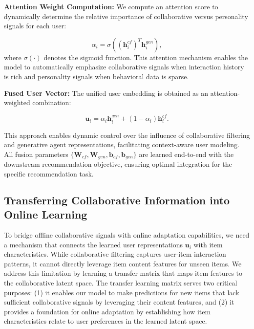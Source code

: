 \documentclass[acmsmall]{acmart}
\begin{document}
\textbf{Attention Weight Computation:} We compute an attention score to dynamically determine the relative importance of collaborative versus personality signals for each user:

\begin{equation}
\alpha_i = \sigma\left((\mathbf{h}^{cf}_i)^T \mathbf{h}^{gen}_i\right),
\label{eq:attention_weight}
\end{equation}
where $\sigma(\cdot)$ denotes the sigmoid function. This attention mechanism enables the model to automatically emphasize collaborative signals when interaction history is rich and personality signals when behavioral data is sparse.

\textbf{Fused User Vector:} The unified user embedding is obtained as an attention-weighted combination:

\begin{equation}
\mathbf{u}_i = \alpha_i \mathbf{h}^{gen}_i + (1 - \alpha_i) \mathbf{h}^{cf}_i.
\label{eq:final_fusion}
\end{equation}

This approach enables dynamic control over the influence of collaborative filtering and generative agent representations, facilitating context-aware user modeling. All fusion parameters $\{\mathbf{W}_{cf}, \mathbf{W}_{gen}, \mathbf{b}_{cf}, \mathbf{b}_{gen}\}$ are learned end-to-end with the downstream recommendation objective, ensuring optimal integration for the specific recommendation task.

\subsection{Transferring Collaborative Information into Online Learning}
\label{sec:transfer_learning}


To bridge offline collaborative signals with online adaptation capabilities, we need a mechanism that connects the learned user representations $\mathbf{u}_i$ with item characteristics. While collaborative filtering captures user-item interaction patterns, it cannot directly leverage item content features for unseen items. We address this limitation by learning a transfer matrix that maps item features to the collaborative latent space.
 The transfer learning matrix serves two critical purposes: (1) it enables our model to make predictions for new items that lack sufficient collaborative signals by leveraging their content features, and (2) it provides a foundation for online adaptation by establishing how item characteristics relate to user preferences in the learned latent space.
\end{document}
